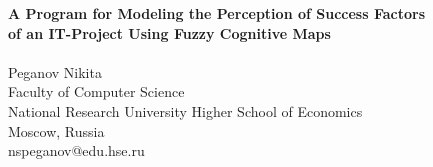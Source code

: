 \documentclass{article}
\begin{document}
    \thispagestyle{empty}
    \begin{center}
        \fontsize{18}{20}\selectfont
        \textbf{
        A Program for Modeling the Perception of Success Factors\\
        of an IT-Project Using Fuzzy Cognitive Maps\\
        }
        ~\\
        \fontsize{14}{16}\selectfont
        Peganov Nikita\\
        Faculty of Computer Science\\
        National Research University Higher School of Economics\\
        Moscow, Russia\\
        nspeganov@edu.hse.ru\\
    \end{center}
    \fontsize{8}{7}\selectfont
\end{document}
